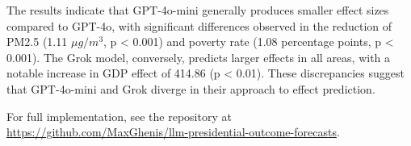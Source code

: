 \begingroup
\renewcommand{\_}{\string_}

\endgroup

The results indicate that GPT-4o-mini generally produces smaller effect sizes compared to GPT-4o, with significant differences observed in the reduction of PM2.5 (1.11 $\mu g/m^3$, p < 0.001) and poverty rate (1.08 percentage points, p < 0.001). The Grok model, conversely, predicts larger effects in all areas, with a notable increase in GDP effect of 414.86 (p < 0.01). These discrepancies suggest that GPT-4o-mini and Grok diverge in their approach to effect prediction.

For full implementation, see the repository at \url{https://github.com/MaxGhenis/llm-presidential-outcome-forecasts}.